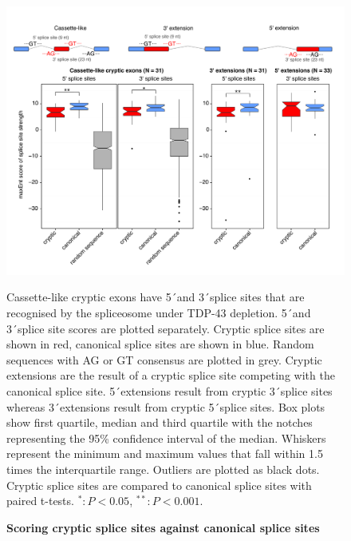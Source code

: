 \begin{figure}[h!]
	\centering
	\includegraphics[width=\textwidth]{Figures/03_cryptic_exons/Figure_6_splice_site_scoring.png}
	\caption{\textbf{Scoring cryptic splice sites against canonical splice sites}}
		Cassette-like cryptic exons have 5\'\ and 3\'\ splice sites that are recognised by the spliceosome under TDP-43 depletion. 5\'\ and 3\'\ splice site scores are plotted separately. Cryptic splice sites are shown in red, canonical splice sites are shown in blue. Random sequences with AG or GT consensus are plotted in grey. Cryptic extensions are the result of a cryptic splice site competing with the canonical splice site. 5\'\ extensions result from cryptic 3\'\ splice sites whereas 3\'\ extensions result from cryptic 5\'\ splice sites. Box plots show first quartile, median and third quartile with the notches representing the 95\% confidence interval of the median. Whiskers represent the minimum and maximum values that fall within 1.5 times the interquartile range. Outliers are plotted as black dots. Cryptic splice sites are compared to canonical splice sites with paired t-tests. $^{*}: P < 0.05$, $^{**}: P < 0.001$.
	\label{fig:cryptic_scoring}
\end{figure}

